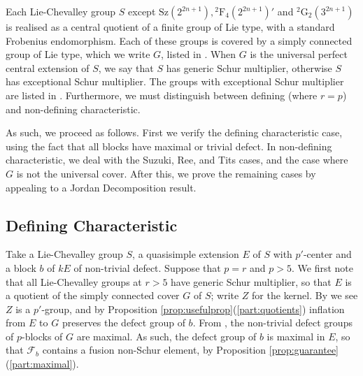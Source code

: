 \documentclass{amsart}
\theoremstyle{plain}\newtheorem{theorem}{Theorem}[section]
\theoremstyle{plain}\newtheorem{conjecture}[theorem]{Conjecture}
\theoremstyle{plain}\newtheorem{corollary}[theorem]{Corollary}
\theoremstyle{plain}\newtheorem{lemma}[theorem]{Lemma}
\theoremstyle{plain}\newtheorem{proposition}[theorem]{Proposition}
\theoremstyle{plain}\newtheorem{statement}[theorem]{}
\theoremstyle{definition}\newtheorem{definition}[theorem]{Definition}
\theoremstyle{definition}\newtheorem{example}[theorem]{Example}
\theoremstyle{definition}\newtheorem{examples}[theorem]{Examples}
\theoremstyle{definition}\newtheorem{notation}[theorem]{Notation}
\theoremstyle{definition}\newtheorem{remark}[theorem]{Remark}
\theoremstyle{definition}\newtheorem{remarks}[theorem]{Remarks}
\theoremstyle{definition}\newtheorem{question}[theorem]{Question}
\theoremstyle{definition}\newtheorem{propositiondefinition}[theorem]{Definition/Proposition}
\begin{document}
Each Lie-Chevalley group $S$ except $\mathrm{Sz}(2^{2n+1}),  \hspace{0pt}^2\mathrm{F}_4(2^{2n+1})'$ and $\hspace{0pt}^2\mathrm{G}_2(3^{2n+1})$ is realised as a central quotient of a finite group of Lie type, with a standard Frobenius endomorphism. Each of these groups is covered by a simply connected group of Lie type, which we write $G$, listed in \cite[Table 24.2]{MalleTesterman}. When $G$ is the universal perfect central extension of $S$, we say that $S$ has generic Schur multiplier, otherwise $S$ has exceptional Schur multiplier. The groups with exceptional Schur multiplier are listed in \cite[Table 24.3]{MalleTesterman}. Furthermore, we must distinguish between defining (where $r=p$) and non-defining characteristic. 

As such, we proceed as follows. First we verify the defining characteristic case, using the fact that all blocks have maximal or trivial defect. In non-defining characteristic, we deal with the Suzuki, Ree, and Tits cases, and the case where $G$ is not the universal cover. After this, we prove the remaining cases by appealing to a Jordan Decomposition result. 
\subsection{Defining Characteristic} 
Take a Lie-Chevalley group $S$, a quasisimple extension $E$ of $S$ with $p'$-center and a block $b$ of $kE$ of non-trivial defect. Suppose that $p=r$ and $p>5$. We first note that all Lie-Chevalley groups at $r>5$ have generic Schur multiplier, so that $E$ is a quotient of the simply connected cover $G$ of $S$; write $Z$ for the kernel. By \cite[Table 24.2]{MalleTesterman} we see $Z$ is a $p'$-group, and by Proposition \ref{prop:usefulprop}(\ref{part:quotients}) inflation from $E$ to $G$ preserves the defect group of $b$. From \cite[Theorem 1]{Humphreys}, the non-trivial defect groups of $p$-blocks of $G$ are maximal. As such, the defect group of $b$ is maximal in $E$, so that $\mathcal{F}_b$ contains a fusion non-Schur element, by Proposition \ref{prop:guarantee}(\ref{part:maximal}). 
\end{document}
